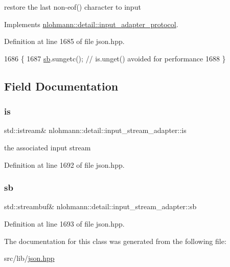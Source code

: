 restore the last non-\/eof() character to input 



Implements \hyperlink{structnlohmann_1_1detail_1_1input__adapter__protocol_aeb5cac3e86e8df6cfe48cc42de2e9225}{nlohmann\+::detail\+::input\+\_\+adapter\+\_\+protocol}.



Definition at line 1685 of file json.\+hpp.


\begin{DoxyCode}
1686     \{
1687         \hyperlink{classnlohmann_1_1detail_1_1input__stream__adapter_addd96de4b5cbd9925ed5d8a0f0261143}{sb}.sungetc();  \textcolor{comment}{// is.unget() avoided for performance}
1688     \}
\end{DoxyCode}


\subsection{Field Documentation}
\mbox{\label{classnlohmann_1_1detail_1_1input__stream__adapter_ac3afada8eaf7d6cd2b475a3388d5e992}} 
\subsubsection{\texorpdfstring{is}{is}}
{\footnotesize\ttfamily std\+::istream\& nlohmann\+::detail\+::input\+\_\+stream\+\_\+adapter\+::is\hspace{0.3cm}{\ttfamily [private]}}



the associated input stream 



Definition at line 1692 of file json.\+hpp.

\mbox{\label{classnlohmann_1_1detail_1_1input__stream__adapter_addd96de4b5cbd9925ed5d8a0f0261143}} 
\subsubsection{\texorpdfstring{sb}{sb}}
{\footnotesize\ttfamily std\+::streambuf\& nlohmann\+::detail\+::input\+\_\+stream\+\_\+adapter\+::sb\hspace{0.3cm}{\ttfamily [private]}}



Definition at line 1693 of file json.\+hpp.



The documentation for this class was generated from the following file\+:\begin{DoxyCompactItemize}
\item 
src/lib/\hyperlink{json_8hpp}{json.\+hpp}\end{DoxyCompactItemize}
